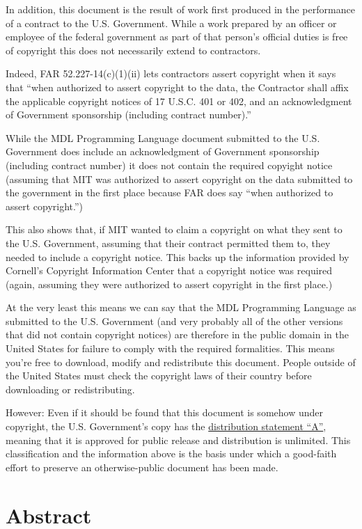 \documentclass[a4paper]{scrbook}
\begin{document}
In addition, this document is the result of work first produced in the performance of a contract to the U.S. Government.
While a work prepared by an officer or employee of the federal government as part of that person's official duties is free
of copyright this does not necessarily extend to contractors.

Indeed, FAR 52.227-14(c)(1)(ii) lets contractors assert copyright when it says that ``when authorized to assert copyright
to the data, the Contractor shall affix the applicable copyright notices of 17 U.S.C. 401 or 402, and an acknowledgment of
Government sponsorship (including contract number).''

While the MDL Programming Language document submitted to the U.S. Government does include an acknowledgment of Government
sponsorship (including contract number) it does not contain the required copyight notice (assuming that MIT was authorized
to assert copyright on the data submitted to the government in the first place because FAR does say ``when authorized to
assert copyright.'')

This also shows that, if MIT wanted to claim a copyright on what they sent to the U.S. Government, assuming that their
contract permitted them to, they needed to include a copyright notice. This backs up the information provided by Cornell's
Copyright Information Center that a copyright notice was required (again, assuming they were authorized to assert copyright
in the first place.)

At the very least this means we can say that the MDL Programming Language as submitted to the U.S. Government (and very
probably all of the other versions that did not contain copyright notices) are therefore in the public domain in the United
States for failure to comply with the required formalities. This means you're free to download, modify and redistribute
this document. People outside of the United States must check the copyright laws of their country before downloading or
redistributing.

However: Even if it should be found that this document is somehow under copyright, the U.S. Government's copy has the
\href{http://www.dtic.mil/dtic/submit/distribution_limitations_and_statements.html}{distribution statement ``A''}, meaning
that it is approved for public release and distribution is unlimited. This classification and the information above is the
basis under which a good-faith effort to preserve an otherwise-public document has been made.

\chapter*{Abstract}\label{abstract}
\end{document}
